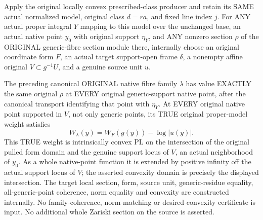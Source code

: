 \begin{theorem}
\label{thm:intrinsic-numerical-original-rational-section-regauging}
\leanok
{}
Apply the original locally convex prescribed-class producer and retain its
SAME actual normalized model, original class $d=ra$, and fixed line index $j$.
For ANY actual proper integral $Y$ mapping to this model over the unchanged
base, an actual native point $y_0$ with original support $\eta_Y$, and ANY
nonzero section $\rho$ of the ORIGINAL generic-fibre section module there,
internally choose an original coordinate form $F$, an actual target
support-open frame $\delta$, a nonempty affine original
$V\subset g^{-1}U$, and a genuine source unit $u$.

The preceding canonical ORIGINAL native fibre family $\lambda$ has value
EXACTLY the same original $\rho$ at EVERY original generic-support native
point, after the canonical transport identifying that point with $\eta_Y$.
At EVERY original native point supported in $V$, not only generic points,
its TRUE original proper-model weight satisfies
\[
 W_\lambda(y)=W_F(g(y))-\log|u(y)|.
\]
This TRUE weight is intrinsically convex PL on the intersection of the original
pulled form domain and the genuine support locus of $V$, an actual neighborhood
of $y_0$. As a whole native-point function it is extended by positive
infinity off the actual support locus of $V$; the asserted convexity domain
is precisely the displayed intersection. The target local section, form, source unit, generic-residue equality,
all-generic-point coherence, norm equality and convexity are constructed
internally. No family-coherence, norm-matching or desired-convexity certificate
is input. No additional whole Zariski section on the source is asserted.
\end{theorem}
